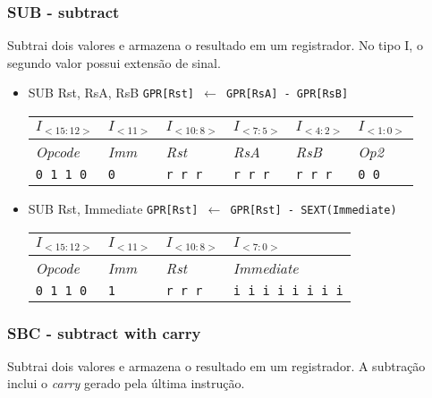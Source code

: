 \documentclass{extreport}
\begin{document}
\subsubsection{SUB - subtract}
Subtrai dois valores e armazena o resultado em um registrador. No tipo I, o segundo valor possui extensão de sinal.

\begin{itemize}
\item SUB Rst, RsA, RsB
\subitem \texttt{GPR[Rst] $\leftarrow$ GPR[RsA] - GPR[RsB]}
\begin{table}[ht!]
\centering
\begin{tabular}{|p{1.6cm}|p{1.6cm}|p{1.6cm}|p{1.6cm}|p{1.6cm}|p{1.6cm}|}
\hline
$I_{<15:12>}$ & $I_{<11>}$ & $I_{<10:8>}$ & $I_{<7:5>}$ & $I_{<4:2>}$ & $I_{<1:0>}$ \\ \hline
\textit{Opcode} & \textit{Imm} & \textit{Rst} & \textit{RsA} & \textit{RsB} & \textit{Op2} \\ \hline
\texttt{0 1 1 0} & \texttt{0} & \texttt{r r r} & \texttt{r r r} & \texttt{r r r} & \texttt{0 0} \\ \hline
\end{tabular}
\end{table}

\item SUB Rst, Immediate
\subitem \texttt{GPR[Rst] $\leftarrow$ GPR[Rst] - SEXT(Immediate)}
\begin{table}[ht!]
\centering
\begin{tabular}{|p{1.6cm}|p{1.6cm}|p{1.6cm}|p{5.65cm}|}
\hline
$I_{<15:12>}$ & $I_{<11>}$ & $I_{<10:8>}$ & $I_{<7:0>}$ \\ \hline
\textit{Opcode} & \textit{Imm} & \textit{Rst} & \textit{Immediate} \\ \hline
\texttt{0 1 1 0} & \texttt{1} & \texttt{r r r} & \texttt{i i i i i i i i} \\ \hline
\end{tabular}
\end{table}
\end{itemize}

\subsubsection{SBC - subtract with carry}
Subtrai dois valores e armazena o resultado em um registrador. A subtração inclui o \textit{carry} gerado pela última instrução.
\end{document}

